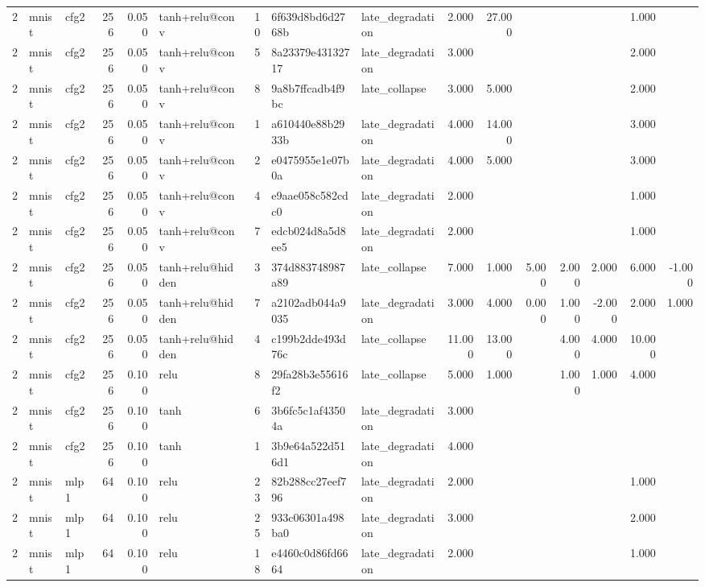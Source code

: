 \begin{table}[htbp]
{\begin{tabular}{@{}rllrrlrllrrrrrrr@{}}
2 & mnist & cfg2 & 256 & 0.050 & tanh+relu@conv & 10 & 6f639d8bd6d2768b & late\_degradation & 2.000 & 27.000 &  &  &  & 1.000 &  \\
2 & mnist & cfg2 & 256 & 0.050 & tanh+relu@conv & 5 & 8a23379e43132717 & late\_degradation & 3.000 &  &  &  &  & 2.000 &  \\
2 & mnist & cfg2 & 256 & 0.050 & tanh+relu@conv & 8 & 9a8b7ffcadb4f9bc & late\_collapse & 3.000 & 5.000 &  &  &  & 2.000 &  \\
2 & mnist & cfg2 & 256 & 0.050 & tanh+relu@conv & 1 & a610440e88b2933b & late\_degradation & 4.000 & 14.000 &  &  &  & 3.000 &  \\
2 & mnist & cfg2 & 256 & 0.050 & tanh+relu@conv & 2 & e0475955e1e07b0a & late\_degradation & 4.000 & 5.000 &  &  &  & 3.000 &  \\
2 & mnist & cfg2 & 256 & 0.050 & tanh+relu@conv & 4 & e9aae058c582cdc0 & late\_degradation & 2.000 &  &  &  &  & 1.000 &  \\
2 & mnist & cfg2 & 256 & 0.050 & tanh+relu@conv & 7 & edcb024d8a5d8ee5 & late\_degradation & 2.000 &  &  &  &  & 1.000 &  \\
2 & mnist & cfg2 & 256 & 0.050 & tanh+relu@hidden & 3 & 374d883748987a89 & late\_collapse & 7.000 & 1.000 & 5.000 & 2.000 & 2.000 & 6.000 & -1.000 \\
2 & mnist & cfg2 & 256 & 0.050 & tanh+relu@hidden & 7 & a2102adb044a9035 & late\_degradation & 3.000 & 4.000 & 0.000 & 1.000 & -2.000 & 2.000 & 1.000 \\
2 & mnist & cfg2 & 256 & 0.050 & tanh+relu@hidden & 4 & c199b2dde493d76c & late\_collapse & 11.000 & 13.000 &  & 4.000 & 4.000 & 10.000 &  \\
2 & mnist & cfg2 & 256 & 0.100 & relu & 8 & 29fa28b3e55616f2 & late\_collapse & 5.000 & 1.000 &  & 1.000 & 1.000 & 4.000 &  \\
2 & mnist & cfg2 & 256 & 0.100 & tanh & 6 & 3b6fc5c1af43504a & late\_degradation & 3.000 &  &  &  &  &  &  \\
2 & mnist & cfg2 & 256 & 0.100 & tanh & 1 & 3b9e64a522d516d1 & late\_degradation & 4.000 &  &  &  &  &  &  \\
2 & mnist & mlp1 & 64 & 0.100 & relu & 23 & 82b288cc27eef796 & late\_degradation & 2.000 &  &  &  &  & 1.000 &  \\
2 & mnist & mlp1 & 64 & 0.100 & relu & 25 & 933c06301a498ba0 & late\_degradation & 3.000 &  &  &  &  & 2.000 &  \\
2 & mnist & mlp1 & 64 & 0.100 & relu & 18 & e4460c0d86fd6664 & late\_degradation & 2.000 &  &  &  &  & 1.000 &  \\

\end{tabular}}
\end{table}
